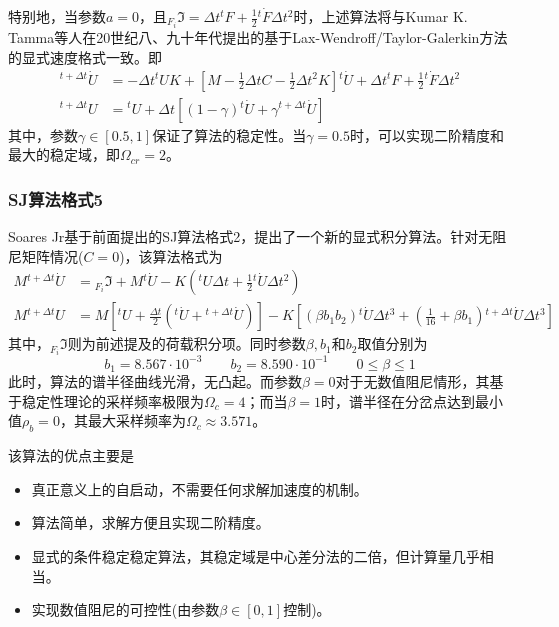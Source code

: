 特别地，当参数$a=0$，且${_{F_i}\!\Im}=\Delta t{^t\!F}+\frac{1}{2}{^t\!\dot{F}}\Delta t^2$时，上述算法将与Kumar K. Tamma等人在20世纪八、九十年代提出的基于Lax-Wendroff/Taylor-Galerkin方法的显式速度格式\cite{Tamma1988f,Tamma1988d,Tamma1989a,Tamma1990c}一致。即
\begin{align}
[M+\frac{1}{2}C\Delta t]{^{t+\Delta t}\!\dot{U}}&=-\Delta t{^t\!U}K+[M-\frac{1}{2}\Delta tC-\frac{1}{2}\Delta t^2K]{^t\!\dot{U}}+\Delta t{^t\!F}+\frac{1}{2}{^t\!\dot{F}}\Delta t^2\\
{^{t+\Delta t}\!U}&={^t\!U}+\Delta t[(1-\gamma){^t\!\dot{U}}+\gamma{^{t+\Delta t}\!\dot{U}}]
\end{align}
其中，参数$\gamma\in[0.5,1]$保证了算法的稳定性。当$\gamma=0.5$时，可以实现二阶精度和最大的稳定域，即$\Omega_{cr}=2$。

\subsubsection{SJ算法格式5\cite{SoaresJr2016b}}
Soares Jr基于前面提出的SJ算法格式2\cite{SoaresJr2014c}，提出了一个新的显式积分算法\cite{SoaresJr2016b}。针对无阻尼矩阵情况($C=0$)，该算法格式为
\begin{align}
 M{^{t+\Delta t}\!\dot{U}}&={_{F_i}\!\Im}+M{^t\!\dot{U}}-K({^t\!U}\Delta t+\frac12{^t\!\dot{U}}\Delta t^2)\\
 M{^{t+\Delta t}\!U}&=M[{^t\!U}+\frac{\Delta t}{2}({^t\!\dot{U}}+{^{t+\Delta t}\!\dot{U}})]-K[(\beta b_1b_2){^t\!\dot{U}}\Delta t^3+(\frac{1}{16}+\beta b_1){^{t+\Delta t}\!\dot{U}}\Delta t^3]
\end{align}
其中，${_{F_i}\!\Im}$则为前述提及的荷载积分项。同时参数$\beta,b_1$和$b_2$取值分别为
\begin{equation}
b_1=8.567\cdot10^{-3}\qquad b_2=8.590\cdot10^{-1}\qquad 0\le\beta\le1
\end{equation}
此时，算法的谱半径曲线光滑，无凸起。而参数$\beta=0$对于无数值阻尼情形，其基于稳定性理论的采样频率极限为$\Omega_c=4$；而当$\beta=1$时，谱半径在分岔点达到最小值$\rho_b=0$，其最大采样频率为$\Omega_c\approx3.571$。

该算法的优点主要是
\begin{itemize}
\item[\ddag] 真正意义上的自启动，不需要任何求解加速度的机制。
\item[\ddag] 算法简单，求解方便且实现二阶精度。
\item[\ddag] 显式的条件稳定稳定算法，其稳定域是中心差分法的二倍，但计算量几乎相当。
\item[\ddag] 实现数值阻尼的可控性(由参数$\beta\in[0,1]$控制)。
\end{itemize}

